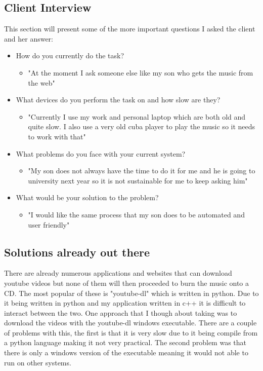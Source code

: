 \documentclass{article}
\begin{document}
\subsection{Client Interview}\label{ClientInterview}
This section will present some of the more important questions I asked the client
and her answer:
\begin{itemize}
    \item How do you currently do the task?
    \begin{itemize}
        \item "At the moment I ask someone else like my son who gets the music from the web"
    \end{itemize}
    \item What devices do you perform the task on and how slow are they?
    \begin{itemize}
        \item "Currently I use my work and personal laptop which are both old and quite slow.
            I also use a very old cuba player to play the music so it needs to work with that"
    \end{itemize}
    \item What problems do you face with your current system?
    \begin{itemize}
        \item "My son does not always have the time to do it for me and he is going to university
            next year so it is not sustainable for me to keep asking him"
    \end{itemize}
    \item What would be your solution to the problem?
    \begin{itemize}
        \item "I would like the same process that my son does to be automated and user friendly"
    \end{itemize}
\end{itemize}
\subsection{Solutions already out there}\label{Solutions}
There are already numerous applications and websites that can download youtube videos but none of
them will then proceeded to burn the music onto a CD. The most popular of these is "youtube-dl"
which is written in python. Due to it being written in python and my application written in c++
it is difficult to interact between the two. One approach that I though about taking was to download
the videos with the youtube-dl windows executable. There are a couple of problems with this, the
first is that it is very slow due to it being compile from a python language making it not very practical.
The second problem was that there is only a windows version of the executable meaning it would not
able to run on other systems.
\end{document}
